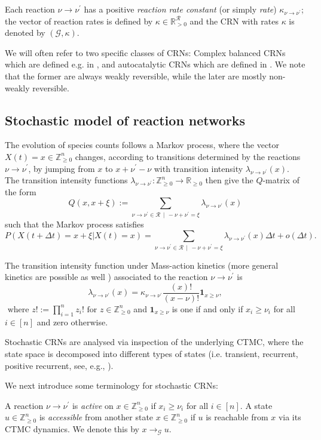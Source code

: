 \documentclass{amsart}
\theoremstyle{definition}
\theoremstyle{remark}
\theoremstyle{Conjecture/open problem}
\theoremstyle{assumption}
\theoremstyle{conjecture}
\newcommand{\st}{\,\mid \,}
\def\la{\lambda}
\def\1{\mathbf{1}}
\def\la{\lambda}
\def\p{^{\prime}}
\def\k{\kappa}
\def\cG{\mathcal{G}}
\def\cR{\mathcal{R}}
\def\R{\mathbb{R}}
\def\Z{\mathbb{Z}}
\numberwithin{equation}{section}
\begin{document}
	 Each reaction $\nu\to \nu\p$ has a positive \emph{reaction rate constant} (or simply \emph {rate}) $\k_{\nu\to\nu\p}$; the  vector of reaction rates is defined by $\k\in\R_{>0}^\cR$
 and the CRN with rates $\k $ is denoted by $(\cG,\k)$.
	

We will often refer to two specific classes of CRNs: Complex balanced CRNs which are defined e.g. in \cite[Section 3.2]{anderson2}, and autocatalytic CRNs which are defined in \cite[Section 3]{hoesslysta}. We note that the former are always weakly reversible, while the later are mostly non-weakly reversible.






  \subsection{Stochastic model of reaction networks}\label{stoch_model}
 The evolution of species counts follows a Markov process, where the vector $X(t)=x\in \Z_{\geq 0}^n$ changes, according to transitions determined by the reactions $\nu\to \nu\p$,  by jumping from $x$ to $x+\nu\p-\nu$  with transition intensity $\la_{\nu \to \nu\p}(x)$.
The transition intensity functions $\la_{\nu \to \nu\p}:\Z_{\geq 0}^n\to \R_{\geq 0}$ then give the $Q$-matrix of the form
$$Q(x,x+\xi):=\sum_{\nu\to\nu\p\in \cR\st-\nu + \nu\p=\xi}\la_{\nu \to \nu\p}(x)$$
such that the Markov process satisfies
$$P(X(t+\Delta t)=x+\xi|X(t)=x)=\sum_{\nu\to\nu\p\in \cR\st-\nu + \nu\p=\xi}\la_{\nu \to \nu\p}(x)\Delta t+ o(\Delta t).$$


The transition intensity function under Mass-action kinetics (more general kinetics are possible as well \cite{anderson2,non-stand_2}) associated to the reaction $\nu\to\nu\p$  is 
\begin{equation}
\label{int}\la_{\nu \to \nu\p}(x)=\k_{\nu\to\nu\p}\frac{(x)!}{(x-\nu)!}
\1_{x\geq \nu},
\end{equation}
$\text{ where }z!:=\prod_{i=1}^nz_i!\text{ for } z\in \Z^n_{\geq 0}$ and $\1_{x\geq \nu}$ is one if and only if $x_i\geq \nu_i$ for all $ i\in [n]$ and zero otherwise.


Stochastic CRNs are analysed via inspection of the underlying CTMC, where the state space is decomposed into different types of states (i.e. transient, recurrent, positive recurrent, see, e.g., \cite[Sections 3.4, 3.5]{norris}).


 We next introduce some terminology for stochastic CRNs:

A reaction $\nu \to \nu \p$ is \emph{active} on $x\in \Z_{\geq 0}^n$ if $x_i\geq \nu_i $ for all $ i\in [n]$. A state $u\in \Z_{\geq 0}^n$ is \emph{accessible} from another state $x\in \Z_{\geq 0}^n$ if $u$ is reachable from $x$ via its CTMC dynamics. We denote this by $x\to_{\cG}u$. 
\end{document}
